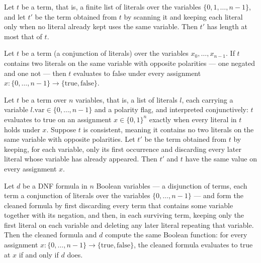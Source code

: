 \begin{lemma}
\label{LMN.dedupTermVar_width_le}
\leanok
{}
Let $t$ be a term, that is, a finite list of literals over the variables $\{0, 1, \dots,
n-1\}$, and let $t'$ be the term obtained from $t$ by scanning it and keeping each
literal only when no literal already kept uses the same variable. Then $t'$ has length
at most that of $t$.
\end{lemma}

\begin{lemma}
\label{LMN.contradiction_term_eval_false}
\leanok
{}
Let $t$ be a term (a conjunction of literals) over the variables $x_0,\dots,x_{n-1}$. If
$t$ contains two literals on the same variable with opposite polarities — one negated
and one not — then $t$ evaluates to false under every assignment $x : \{0,\dots,n-1\}
\to \{\mathrm{true},\mathrm{false}\}$.
\end{lemma}

\begin{lemma}
\label{LMN.dedupTermVar_preserves_term_eval}
\leanok
{}
Let $t$ be a term over $n$ variables, that is, a list of literals $l$, each carrying a
variable $l.\mathrm{var} \in \{0,\dots,n-1\}$ and a polarity flag, and interpreted
conjunctively: $t$ evaluates to true on an assignment $x \in \{0,1\}^n$ exactly when
every literal in $t$ holds under $x$. Suppose $t$ is consistent, meaning it contains no
two literals on the same variable with opposite polarities. Let $t'$ be the term
obtained from $t$ by keeping, for each variable, only its first occurrence and
discarding every later literal whose variable has already appeared. Then $t'$ and $t$
have the same value on every assignment $x$.
\end{lemma}

\begin{lemma}
\label{LMN.cleanDNF_eval}
\leanok
{}
Let $d$ be a DNF formula in $n$ Boolean variables — a disjunction of terms, each term a
conjunction of literals over the variables $\{0,\dots,n-1\}$ — and form the cleaned
formula by first discarding every term that contains some variable together with its
negation, and then, in each surviving term, keeping only the first literal on each
variable and deleting any later literal repeating that variable. Then the cleaned
formula and $d$ compute the same Boolean function: for every assignment $x \colon
\{0,\dots,n-1\} \to \{\mathrm{true},\mathrm{false}\}$, the cleaned formula evaluates to
true at $x$ if and only if $d$ does.
\end{lemma}

